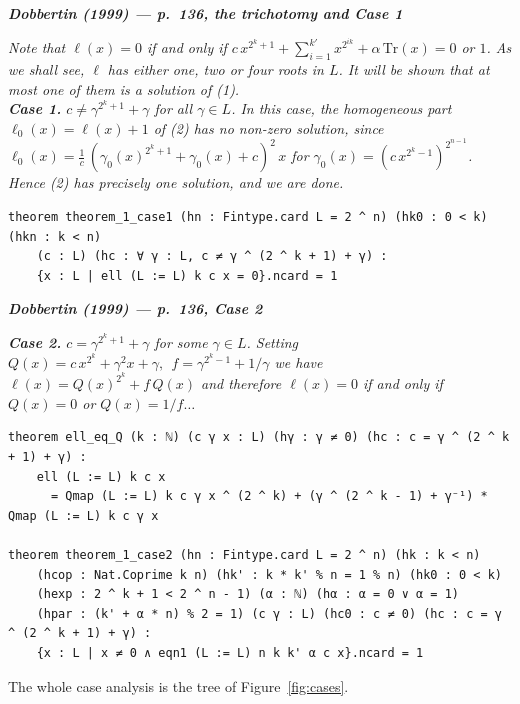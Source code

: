 \documentclass[11pt]{article}
\newenvironment{paperquote}[1]
 {\par\smallskip\noindent
  \def\FrameCommand{\color{quotebar}\vrule width 3pt\hspace{8pt}}%
  \MakeFramed{\advance\hsize-\width \FrameRestore}%
  \small\itshape
  \noindent\normalfont\footnotesize\textbf{\textsf{Dobbertin (1999) --- #1}}\par\nobreak\smallskip\itshape}
 {\endMakeFramed\par\smallskip}
\theoremstyle{definition}
\begin{document}
\begin{paperquote}{p.~136, the trichotomy and Case 1}
Note that $\ell(x)=0$ if and only if
$c\,x^{2^k+1}+\sum_{i=1}^{k'}x^{2^{ik}}+\alpha\,\mathrm{Tr}(x)=0$ or $1$. As we
shall see, $\ell$ has either one, two or four roots in $L$. It will be shown that
at most one of them is a solution of (1). \\[2pt]
\textbf{Case 1.} $c\neq\gamma^{2^k+1}+\gamma$ for all $\gamma\in L$. In this
case, the homogeneous part $\ell_0(x)=\ell(x)+1$ of (2) has no non-zero
solution, since $\ell_0(x)=\tfrac1c\,(\gamma_0(x)^{2^k+1}+\gamma_0(x)+c)^2\,x$
for $\gamma_0(x)=(c\,x^{2^k-1})^{2^{n-1}}$. Hence (2) has precisely one solution,
and we are done.
\end{paperquote}

\begin{lstlisting}
theorem theorem_1_case1 (hn : Fintype.card L = 2 ^ n) (hk0 : 0 < k) (hkn : k < n)
    (c : L) (hc : ∀ γ : L, c ≠ γ ^ (2 ^ k + 1) + γ) :
    {x : L | ell (L := L) k c x = 0}.ncard = 1
\end{lstlisting}

\begin{paperquote}{p.~136, Case 2}
\textbf{Case 2.} $c=\gamma^{2^k+1}+\gamma$ for some $\gamma\in L$. Setting
$Q(x)=c\,x^{2^k}+\gamma^2 x+\gamma,\ \ f=\gamma^{2^k-1}+1/\gamma$ we have
$\ell(x)=Q(x)^{2^k}+f\,Q(x)$ and therefore $\ell(x)=0$ if and only if $Q(x)=0$
or $Q(x)=1/f\ldots$
\end{paperquote}

\begin{lstlisting}
theorem ell_eq_Q (k : ℕ) (c γ x : L) (hγ : γ ≠ 0) (hc : c = γ ^ (2 ^ k + 1) + γ) :
    ell (L := L) k c x
      = Qmap (L := L) k c γ x ^ (2 ^ k) + (γ ^ (2 ^ k - 1) + γ⁻¹) * Qmap (L := L) k c γ x

theorem theorem_1_case2 (hn : Fintype.card L = 2 ^ n) (hk : k < n)
    (hcop : Nat.Coprime k n) (hk' : k * k' % n = 1 % n) (hk0 : 0 < k)
    (hexp : 2 ^ k + 1 < 2 ^ n - 1) (α : ℕ) (hα : α = 0 ∨ α = 1)
    (hpar : (k' + α * n) % 2 = 1) (c γ : L) (hc0 : c ≠ 0) (hc : c = γ ^ (2 ^ k + 1) + γ) :
    {x : L | x ≠ 0 ∧ eqn1 (L := L) n k k' α c x}.ncard = 1
\end{lstlisting}

The whole case analysis is the tree of Figure~\ref{fig:cases}.
\end{document}
